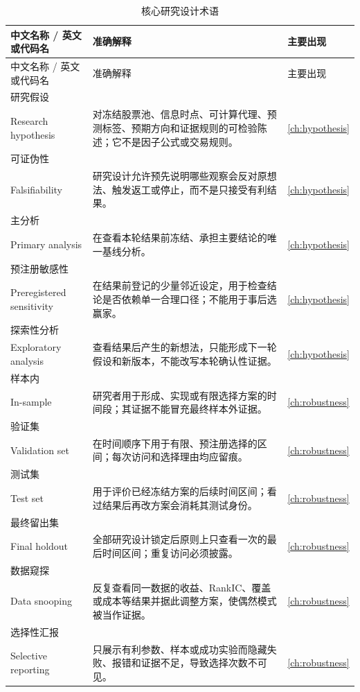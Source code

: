 \begingroup
\footnotesize
\setlength{\tabcolsep}{3pt}
\begin{longtable}{@{}p{3.2cm}p{9.0cm}p{2.8cm}@{}}
\caption{核心研究设计术语}\label{tab:appA-research-terms}\\
\toprule
中文名称 / 英文或代码名 & 准确解释 & 主要出现 \\
\midrule
\endfirsthead
\toprule
中文名称 / 英文或代码名 & 准确解释 & 主要出现 \\
\midrule
\endhead
研究假设\\Research hypothesis & 对冻结股票池、信息时点、可计算代理、预测标签、预期方向和证据规则的可检验陈述；它不是因子公式或交易规则。 & \cref{ch:hypothesis} \\
可证伪性\\Falsifiability & 研究设计允许预先说明哪些观察会反对原想法、触发返工或停止，而不是只接受有利结果。 & \cref{ch:hypothesis} \\
主分析\\Primary analysis & 在查看本轮结果前冻结、承担主要结论的唯一基线分析。 & \cref{ch:hypothesis} \\
预注册敏感性\\Preregistered sensitivity & 在结果前登记的少量邻近设定，用于检查结论是否依赖单一合理口径；不能用于事后选赢家。 & \cref{ch:hypothesis} \\
探索性分析\\Exploratory analysis & 查看结果后产生的新想法，只能形成下一轮假设和新版本，不能改写本轮确认性证据。 & \cref{ch:hypothesis} \\
样本内\\In-sample & 研究者用于形成、实现或有限选择方案的时间段；其证据不能冒充最终样本外证据。 & \cref{ch:robustness} \\
验证集\\Validation set & 在时间顺序下用于有限、预注册选择的区间；每次访问和选择理由均应留痕。 & \cref{ch:robustness} \\
测试集\\Test set & 用于评价已经冻结方案的后续时间区间；看过结果后再改方案会消耗其测试身份。 & \cref{ch:robustness} \\
最终留出集\\Final holdout & 全部研究设计锁定后原则上只查看一次的最后时间区间；重复访问必须披露。 & \cref{ch:robustness} \\
数据窥探\\Data snooping & 反复查看同一数据的收益、RankIC、覆盖或成本等结果并据此调整方案，使偶然模式被当作证据。 & \cref{ch:robustness} \\
选择性汇报\\Selective reporting & 只展示有利参数、样本或成功实验而隐藏失败、报错和证据不足，导致选择次数不可见。 & \cref{ch:robustness} \\
\bottomrule
\end{longtable}
\endgroup

